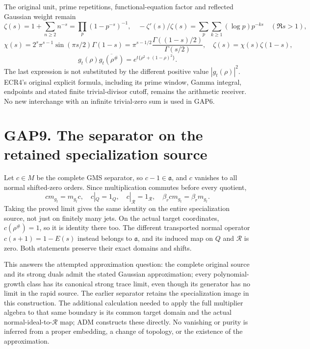 The original unit, prime repetitions, functional-equation factor and
reflected Gaussian weight remain \[
\zeta(s)=1+\sum_{n\ge2}n^{-s}=\prod_p(1-p^{-s})^{-1},\quad
-\zeta'(s)/\zeta(s)=\sum_p\sum_{k\ge1}(\log p)p^{-ks}
\quad(\Re s>1),
\] \[
\chi(s)=2^s\pi^{s-1}\sin(\pi s/2)\Gamma(1-s)
=\pi^{s-1/2}\frac{\Gamma((1-s)/2)}{\Gamma(s/2)},
\quad\zeta(s)=\chi(s)\zeta(1-s),
\] \[
g_t(\rho)\overline{g_t(\rho^\#)}
=e^{t\{\rho^2+(1-\rho)^2\}}.
\tag{GAP8.4}
\] The last expression is not substituted by the different positive
value \(|g_t(\rho)|^2\). ECR4's original explicit formula, including its
prime window, Gamma integral, endpoints and stated finite
trivial-divisor cutoff, remains the arithmetic receiver. No new
interchange with an infinite trivial-zero sum is used in GAP6.

\section{GAP9. The separator on the retained specialization
source}\label{gap9.-the-separator-on-the-retained-specialization-source}

Let \(c\in M\) be the complete GMS separator, so \(c-1\in\mathfrak a\),
and \(c\) vanishes to all normal shifted-zero orders. Since
multiplication commutes before every quotient, \[
cm_{g_t}=m_{g_t}c,\quad c|_Q=1_Q,\quad c|_{\mathcal R}=1_{\mathcal R},
\quad\beta_rcm_{g_t}=\beta_rm_{g_t}.
\tag{GAP9.1}
\] Taking the proved limit gives the same identity on the entire
specialization source, not just on finitely many jets. On the actual
target coordinates, \(c(\rho^\#)=1\), so it is identity there too. The
different transported normal operator \(c(s+1)=1-E(s)\) instead belongs
to \(\mathfrak a\), and its induced map on \(Q\) and \(\mathcal R\) is
zero. Both statements preserve their exact domains and shifts.

This answers the attempted approximation question: the complete original
source and its strong duals admit the stated Gaussian approximation;
every polynomial-growth class has its canonical strong trace limit, even
though its generator has no limit in the rapid source. The earlier
separator retains the specialization image in this construction. The
additional calculation needed to apply the full multiplier algebra to
that same boundary is its common target domain and the actual
normal-ideal-to-\(\mathcal R\) map; ADM constructs these directly. No
vanishing or purity is inferred from a proper embedding, a change of
topology, or the existence of the approximation.

